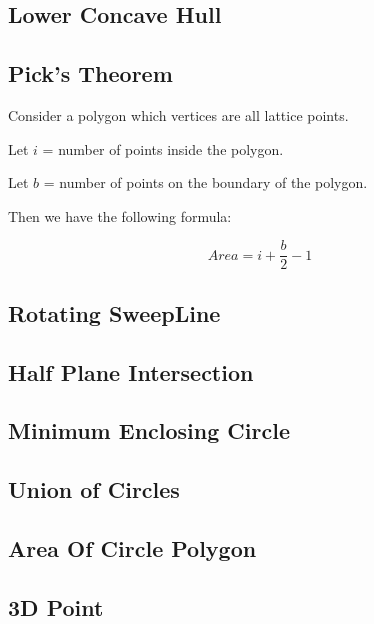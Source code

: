 \documentclass[a4paper,10pt,twocolumn,oneside,x11names]{article}
\begin{document}
\subsection{Lower Concave Hull}



\subsection{Pick's Theorem}
Consider a polygon which vertices are all lattice points.

Let $i$ = number of points inside the polygon.

Let $b$ = number of points on the boundary of the polygon.

Then we have the following formula:

$$
Area = i + \frac{b}{2} - 1
$$

\subsection{Rotating SweepLine}


\subsection{Half Plane Intersection}


\subsection{Minimum Enclosing Circle}


\subsection{Union of Circles}


\subsection{Area Of Circle Polygon}


\subsection{3D Point}

\end{document}
